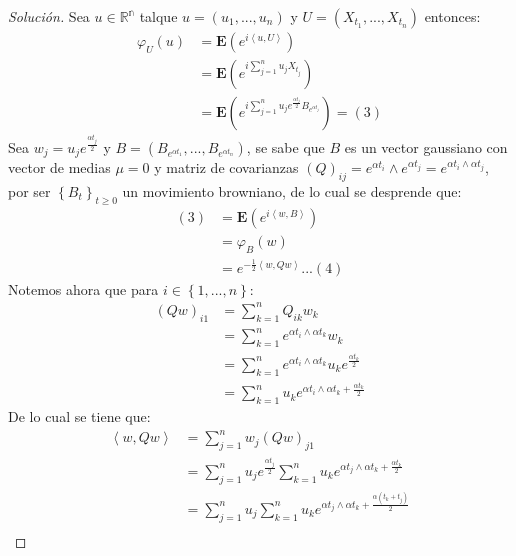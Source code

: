 \documentclass[11pt,notitlepage]{article}
\newenvironment{solucion}
  {\begin{proof}[Solución]}
  {\end{proof}}
\begin{document}
\begin{itemize}
  \begin{solucion}
  Sea \(u \in \mathbb{R^n}\) talque \(u = (u_1,...,u_n)\) y \(U = (X_{t_{1}},...,X_{t_{n}})\) entonces: 
  \begin{align*}
       \varphi_{U}(u)    &=  \mathbf{E}\left ( e^{i\left \langle u,U \right \rangle} \right )         \\
                         &=  \mathbf{E}\left ( e^{i\sum_{j=1}^{n}u_jX_{t_j}} \right )          \\
                         &=  \mathbf{E}\left ( e^{i\sum_{j=1}^{n}u_je^{\frac{\alpha t_j}{2}}B_{e^{\alpha t_j}}} \right ) = (3)         
  \end{align*}
  Sea \(w_j = u_je^{\frac{\alpha t_j}{2}}\) y \(B = (B_{e^{\alpha t_1}},...,B_{e^{\alpha t_n}})\), se sabe que \(B\) es un vector gaussiano con vector de medias \(\mu = 0\) y matriz de covarianzas \((Q)_{ij} = e^{\alpha t_i}\wedge e^{\alpha t_j} = e^{\alpha t_i \wedge\alpha t_j }\), por ser \(\left \{ B_{t} \right \}_{t\geq 0}\) un movimiento browniano, de lo cual se desprende que:
  \begin{align*} 
      (3) &=  \mathbf{E}\left ( e^{i\left \langle w,B \right \rangle} \right )                           \\
          &=   \varphi_{B}(w)                           \\
          &=   e^{-\frac{1}{2}\left \langle w,Qw \right \rangle}...(4)
  \end{align*}
  Notemos ahora que para \(i \in \left \{1,...,n \right \} \): 
  \begin{align*}
      (Qw)_{i1}  &=\sum_{k=1}^{n}Q_{ik}w_k     \\
                 &=\sum_{k=1}^{n}e^{\alpha t_i \wedge\alpha t_k }w_k   \\
                 &=\sum_{k=1}^{n}e^{\alpha t_i \wedge\alpha t_k} u_ke^{\frac{\alpha t_k}{2}}                            \\
                 &=\sum_{k=1}^{n}u_ke^{\alpha t_i \wedge\alpha t_k + \frac{\alpha t_k}{2}}
  \end{align*}
 De lo cual se tiene que:
 \begin{align*}
    \left \langle w,Qw \right \rangle &= \sum_{j=1}^{n}w_j(Qw)_{j1}   \\
                                      &= \sum_{j=1}^{n}u_je^{\frac{\alpha t_j}{2}}\sum_{k=1}^{n}u_ke^{\alpha t_j \wedge\alpha t_k + \frac{\alpha t_k}{2}}   \\
                                      &=\sum_{j=1}^{n}u_j\sum_{k=1}^{n}u_ke^{\alpha t_j \wedge\alpha t_k + \frac{\alpha (t_k + t_j)}{2}}    \\

\end{align*}
\end{solucion}
\end{itemize}
\end{document}
